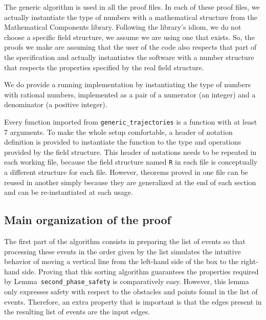\documentclass[a4paper, USenglish, cleveref, autoref, thm-restate, final]{lipics-v2021}
\begin{document}
The generic algorithm is used in all the proof files.  In each of
these proof files, we actually instantiate the type of numbers with
a mathematical structure from the {\sc Mathematical Components} library.
Following the library's idiom, we do not choose a specific field structure,
we assume we are using one that exists.  So, the proofs we make are assuming
that the user of the code also respects that part of the specification and
actually instantiates the software with a number structure that respects the
properties specified by the real field structure.

We do provide a running implementation by instantiating the
type of numbers with rational numbers, implemented as a pair of a numerator
(an integer) and a denominator (a positive integer).

Every function imported from {\tt generic\_trajectories} is a function
with at least 7 arguments.  To make the whole setup comfortable, a
header of notation definition is provided to instantiate the function
to the type and operations provided by the field structure.  This header of
notations needs to be repeated in each working file, because the field
structure named {\tt R} in each file is conceptually a different structure
for each file.   However, theorems proved in one file can be reused in another
simply because they are generalized at the end of each section and can be
re-instantiated at each usage.

\subsection{Main organization of the proof}
The first part of the algorithm consists in preparing the list of
events so that processing these events in the order given by the list
simulates the intuitive behavior of moving a vertical line
from the left-hand side of the box to the right-hand
side.  Proving that this sorting algorithm guarantees the properties
required by Lemma~{\tt second\_phase\_safety} is comparatively easy.
However, this lemma only expresses safety with respect to the obstacles and
points found in the list of events.  Therefore, an extra property that is
important is that the edges present in the resulting
list of events are the input edges.
\end{document}
